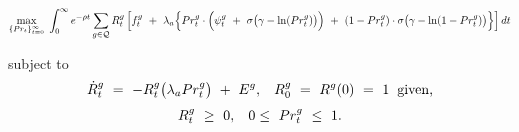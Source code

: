 \begin{small}
\begin{equation}
\begin{split}
    \underset{\{Pr_{t}\}_{t = 0}^{\infty}}{\max} \hspace{0.1cm} \int_{0}^{\infty} e^{-\rho t} \sum_{g \in \mathcal{Q}} R_{t}^{g} \left[ f_{t}^{g} \ + \ \lambda_{a} \Big\{ Pr_{t}^{g} \cdot \Big( \psi_{t}^{g} \ + \ \sigma \big( \gamma - \ln(Pr_{t}^{g}) \big) \Big) \ + \ (1 - Pr_{t}^{g}) \cdot \sigma \big( \gamma - \ln(1 - Pr_{t}^{g}) \big) \Big\} \right] dt
\end{split}
\label{Equation:Firms-Problem_Expected-Payoff-Maximization-Problem}
\end{equation}
\end{small}
subject to
\begin{equation}
\begin{split}
    \dot{R}_{t}^{g} \ = \ -R_{t}^{g} \big( \lambda_{a} Pr_{t}^{g} \big) \ + \ E^{g}, \hspace{0.3cm} R_{0}^{g} \ = \ R^{g}(0) \ = \ 1 \hspace{0.2cm} \text{given,}
\end{split}
\end{equation}
\begin{equation}
\begin{split}
    R_{t}^{g} \ \geq \ 0, \hspace{0.3cm} 0 \leq \ Pr_{t}^{g} \ \leq \ 1.
\end{split}
\end{equation}
